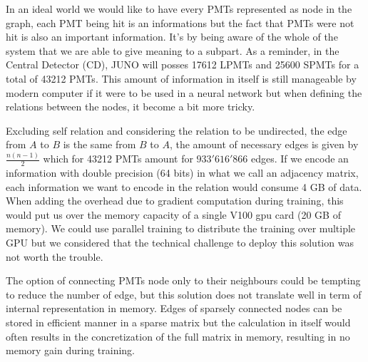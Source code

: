 \documentclass[../main.tex]{subfiles}
\begin{document}
In an ideal world we would like to have every PMTs represented as node in the graph, each PMT being hit is an informations but the fact that PMTs were not hit is also an important information. It's by being aware of the whole of the system that we are able to give meaning to a subpart. As a reminder, in the Central Detector (CD), JUNO will posses 17612 LPMTs and 25600 SPMTs for a total of 43212 PMTs. This amount of information in itself is still manageable by modern computer if it were to be used in a neural network but when defining the relations between the nodes, it become a bit more tricky.

Excluding self relation and considering the relation to be undirected, the edge from $A$ to $B$ is the same from $B$ to $A$, the amount of necessary edges is given by $\frac{n(n-1)}{2}$ which for 43212 PMTs amount for $933'616'866$ edges. If we encode an information with double precision (64 bits) in what we call an adjacency matrix, each information we want to encode in the relation would consume 4 GB of data. When adding the overhead due to gradient computation during training, this would put us over the memory capacity of a single V100 gpu card (20 GB of memory). We could use parallel training to distribute the training over multiple GPU but we considered that the technical challenge to deploy this solution was not worth the trouble.

The option of connecting PMTs node only to their neighbours could be tempting to reduce the number of edge, but this solution does not translate well in term of internal representation in memory. Edges of sparsely connected nodes can be stored in efficient manner in a sparse matrix but the calculation in itself would often results in the concretization of the full matrix in memory, resulting in no memory gain during training.
\end{document}

